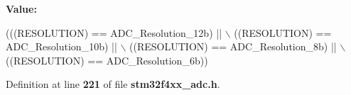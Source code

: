 {\bfseries Value\+:}
\begin{DoxyCode}
(((RESOLUTION) == ADC_Resolution_12b) || \(\backslash\)
                                       ((RESOLUTION) == ADC_Resolution_10b) || \(\backslash\)
                                       ((RESOLUTION) == ADC_Resolution_8b) || \(\backslash\)
                                       ((RESOLUTION) == ADC_Resolution_6b))
\end{DoxyCode}


Definition at line \textbf{ 221} of file \textbf{ stm32f4xx\+\_\+adc.\+h}.

